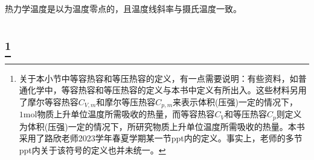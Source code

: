            热力学温度是以为温度零点的，且温度线斜率与摄氏温度一致。
    \section[热力学第一定律]{}
        \subsection[热与功]{\footnote{关于本小节中等容热容和等压热容的定义，有一点需要说明：有些资料，如普通化学中，等容热容和等压热容的定义与本书中定义有所出入。这些材料另用了摩尔等容热容$C_{V,m}$和摩尔等压热容$C_{p,m}$来表示体积(压强)一定的情况下，$1\mathrm{mol}$物质上升单位温度所需吸收的热量，而等容热容$C_V$和等压热容$C_p$则定义为体积(压强)一定的情况下，所研究物质上升单位温度所需吸收的热量。本书采用了路欣老师2023学年春夏学期某一节ppt内的定义。事实上，老师的多节ppt内关于该符号的定义也并未统一。}}
